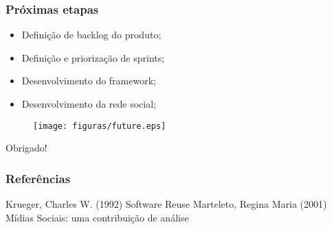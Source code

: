 \documentclass{beamer}
\begin{document}
\begin{frame}
\frametitle{Próximas etapas}

\begin{itemize}
	\item Definição de backlog do produto;
	\item Definição e priorização de sprints;
	\item Desenvolvimento do framework;
	\item Desenvolvimento da rede social;
\end{itemize}

\begin{figure}[h]
	\centering
	\texttt{[image: figuras/future.eps]}
\end{figure}

\end{frame}

\begin{frame}
\Huge{\centerline{Obrigado!}}
\end{frame}

\begin{frame}
\frametitle{Referências}
\footnotesize{
\begin{thebibliography}{99} %
 Krueger, Charles W. (1992)
\newblock Software Reuse
 Marteleto, Regina Maria (2001)
\newblock Mídias Sociais: uma contribuição de análise
\end{thebibliography}
}
\end{frame}
\end{document}
